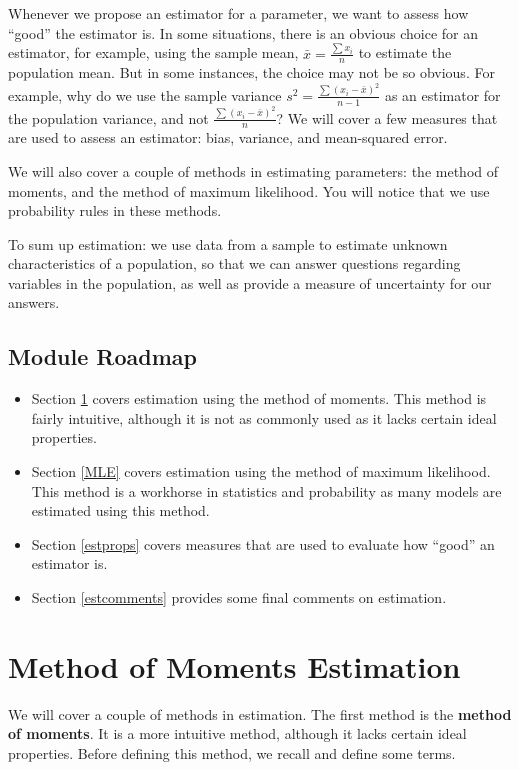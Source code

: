 \documentclass[
]{book}
\providecommand{\tightlist}{%
  \setlength{\itemsep}{0pt}\setlength{\parskip}{0pt}}
\begin{document}
Whenever we propose an estimator for a parameter, we want to assess how ``good'' the estimator is. In some situations, there is an obvious choice for an estimator, for example, using the sample mean, \(\bar{x} = \frac{\sum x_i}{n}\) to estimate the population mean. But in some instances, the choice may not be so obvious. For example, why do we use the sample variance \(s^2 = \frac{\sum (x_i - \bar{x})^2}{n-1}\) as an estimator for the population variance, and not \(\frac{\sum (x_i - \bar{x})^2}{n}\)? We will cover a few measures that are used to assess an estimator: bias, variance, and mean-squared error.

We will also cover a couple of methods in estimating parameters: the method of moments, and the method of maximum likelihood. You will notice that we use probability rules in these methods.

To sum up estimation: we use data from a sample to estimate unknown characteristics of a population, so that we can answer questions regarding variables in the population, as well as provide a measure of uncertainty for our answers.

\hypertarget{module-roadmap-5}{%
\subsection{Module Roadmap}\label{module-roadmap-5}}

\begin{itemize}
\tightlist
\item
  Section \ref{MOM} covers estimation using the method of moments. This method is fairly intuitive, although it is not as commonly used as it lacks certain ideal properties.
\item
  Section \ref{MLE} covers estimation using the method of maximum likelihood. This method is a workhorse in statistics and probability as many models are estimated using this method.
\item
  Section \ref{estprops} covers measures that are used to evaluate how ``good'' an estimator is.
\item
  Section \ref{estcomments} provides some final comments on estimation.
\end{itemize}

\hypertarget{MOM}{%
\section{Method of Moments Estimation}\label{MOM}}

We will cover a couple of methods in estimation. The first method is the \textbf{method of moments}. It is a more intuitive method, although it lacks certain ideal properties. Before defining this method, we recall and define some terms.
\end{document}
